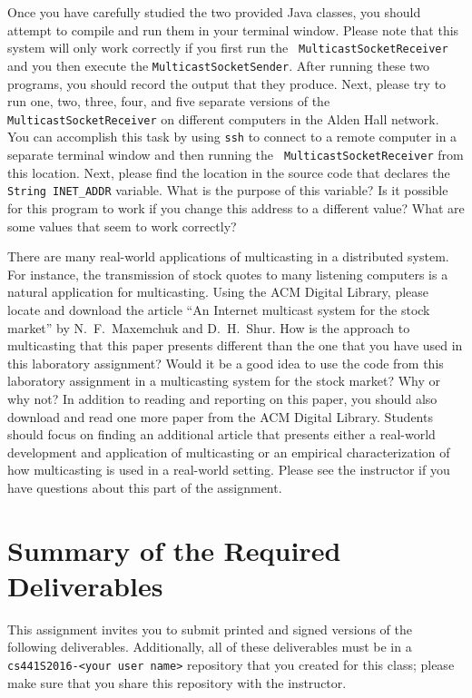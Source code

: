 Once you have carefully studied the two provided Java classes, you should attempt to compile and run them in your
terminal window. Please note that this system will only work correctly if you first run the {\tt
MulticastSocketReceiver} and you then execute the {\tt MulticastSocketSender}. After running these two programs, you
should record the output that they produce. Next, please try to run one, two, three, four, and five separate versions of
the {\tt MulticastSocketReceiver} on different computers in the Alden Hall network. You can accomplish this task by
using {\tt ssh} to connect to a remote computer in a separate terminal window and then running the {\tt
  MulticastSocketReceiver} from this location. Next, please find the location in the source code that declares the {\tt
String INET\_ADDR} variable. What is the purpose of this variable? Is it possible for this program to work if you change
this address to a different value? What are some values that seem to work correctly?

There are many real-world applications of multicasting in a distributed system. For instance, the transmission of stock
quotes to many listening computers is a natural application for multicasting. Using the ACM Digital Library, please
locate and download the article ``An Internet multicast system for the stock market'' by N.\ F.\ Maxemchuk and D.\ H.\
Shur. How is the approach to multicasting that this paper presents different than the one that you have used in this
laboratory assignment? Would it be a good idea to use the code from this laboratory assignment in a multicasting system
for the stock market? Why or why not? In addition to reading and reporting on this paper, you should also download and
read one more paper from the ACM Digital Library. Students should focus on finding an additional article that presents
either a real-world development and application of multicasting or an empirical characterization of how multicasting is
used in a real-world setting. Please see the instructor if you have questions about this part of the assignment.

\section*{Summary of the Required Deliverables}

This assignment invites you to submit printed and signed versions of the following deliverables. Additionally,
all of these deliverables must be in a {\tt cs441S2016-<your user name>} repository that you created for this class;
please make sure that you share this repository with the instructor.

